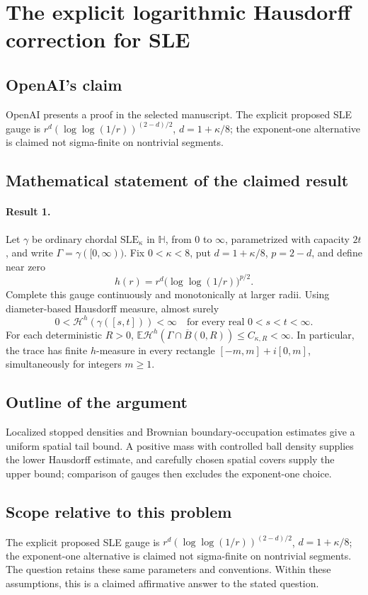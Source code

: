 \documentclass[11pt]{article}
\begin{document}
\section*{The explicit logarithmic Hausdorff correction for SLE}

\subsection{OpenAI's claim}
OpenAI presents a proof in the selected manuscript. The explicit proposed SLE gauge is $r^d(\log\log(1/r))^{(2-d)/2}$, $d=1+\kappa/8$; the exponent-one alternative is claimed not sigma-finite on nontrivial segments.

\subsection{Mathematical statement of the claimed result}
\paragraph{Result 1.} Let $\gamma$ be ordinary chordal $\mathrm{SLE}_\kappa$ in $\mathbb H$, from $0$ to $\infty$, parametrized with capacity $2t$, and write $\Gamma=\gamma([0,\infty))$. Fix $0<\kappa<8$, put $d=1+\kappa/8$, $p=2-d$, and define near zero
\[
 h(r)=r^d\bigl(\log\log(1/r)\bigr)^{p/2}.
\]
Complete this gauge continuously and monotonically at larger radii. Using diameter-based Hausdorff measure, almost surely
\[
 0<\mathcal H^h(\gamma([s,t]))<\infty\quad\text{for every real }0<s<t<\infty.
\]
For each deterministic $R>0$, $\mathbb E\mathcal H^h(\Gamma\cap\overline B(0,R))\le C_{\kappa,R}<\infty$. In particular, the trace has finite $h$-measure in every rectangle $[-m,m]+i[0,m]$, simultaneously for integers $m\ge1$.

\subsection{Outline of the argument}
Localized stopped densities and Brownian boundary-occupation estimates give a uniform spatial tail bound. A positive mass with controlled ball density supplies the lower Hausdorff estimate, and carefully chosen spatial covers supply the upper bound; comparison of gauges then excludes the exponent-one choice.

\subsection{Scope relative to this problem}
The explicit proposed SLE gauge is $r^d(\log\log(1/r))^{(2-d)/2}$, $d=1+\kappa/8$; the exponent-one alternative is claimed not sigma-finite on nontrivial segments. The question retains these same parameters and conventions. Within these assumptions, this is a claimed affirmative answer to the stated question.
\end{document}
